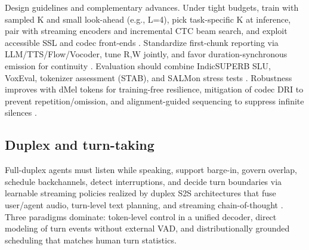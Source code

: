 \documentclass{article}
\begin{document}
Design guidelines and complementary advances. Under tight budgets, train with sampled K and small look-ahead (e.g., L=4), pick task-specific K at inference, pair with streaming encoders and incremental CTC beam search, and exploit accessible SSL and codec front-ends \cite{ouyang2025cmusiwslt2025simultaneousspeechtranslati,chen2023reducingbarriersselfsupervisedlearninghu,dhawan2024codecasrtrainingperformantautomaticspeec,sheng2025syncspeechlowlatencyefficientdualstreamt}. Standardize first-chunk reporting via LLM/TTS/Flow/Vocoder, tune R,W jointly, and favor duration-synchronous emission for continuity \cite{fang2025llamaomni2llmbasedrealtimespokenchatbota,sheng2025syncspeechlowlatencyefficientdualstreamt}. Evaluation should combine IndicSUPERB SLU, VoxEval, tokenizer assessment (STAB), and SALMon stress tests \cite{entry2025indicsuperbspeechprocessinguniversalperf,cui2025voxevalbenchmarkingknowledgeunderstandin,vashishth2024stabspeechtokenizerassessmentbenchmark,maimon2025salmonsuiteacousticlanguagemodelevaluati}. Robustness improves with dMel tokens for training-free resilience, mitigation of codec DRI to prevent repetition/omission, and alignment-guided sequencing to suppress infinite silences \cite{bai2025dmelspeechtokenizationmadesimple,liu2024analyzingmitigatinginconsistencydiscrete,li2024investigatingneuralaudiocodecsspeechlang,song2024ellavstableneuralcodeclanguagemodelingal}.



\subsection{Duplex and turn-taking} \label{subsec:duplexandturn-taking}

Full-duplex agents must listen while speaking, support barge-in, govern overlap, schedule backchannels, detect interruptions, and decide turn boundaries via learnable streaming policies realized by duplex S2S architectures that fuse user/agent audio, turn-level text planning, and streaming chain-of-thought \cite{hu2025salmduplexefficientdirectmodelingspeechl,cui2025thinkbeforeyoutalkenhancingmeaningfuldia,guo2025streamuniachievingstreamingspeechtransla}. Three paradigms dominate: token-level control in a unified decoder, direct modeling of turn events without external VAD, and distributionally grounded scheduling that matches human turn statistics.
\end{document}

